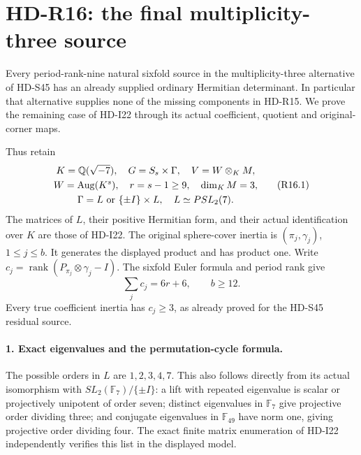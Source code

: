 \section{HD-R16: the final multiplicity-three source}
\label{sec:rank-three-tensor-final-budget}

Every period-rank-nine natural sixfold source in the
multiplicity-three alternative of HD-S45 has an already
supplied ordinary Hermitian determinant. In particular that
alternative supplies none of the missing components in HD-R15.
We prove the remaining case of HD-I22 through its actual
coefficient, quotient and original-corner maps.

Thus retain
\[
 \begin{gathered}
 K=\mathbb Q(\sqrt{-7}),\quad G=S_s\times\Gamma,
       \quad V=W\otimes_KM,\\
 W=\operatorname{Aug}(K^s),\quad r=s-1\ge9,\quad\dim_KM=3,\\
 \Gamma=L\ \hbox{or}\ \{\pm I\}\times L,
       \quad L\simeq PSL_2(7).
 \end{gathered}                                           \tag{R16.1}
\]
The matrices of \(L\), their positive Hermitian form, and
their actual identification over \(K\) are those of HD-I22.
The original sphere-cover inertia is
\((\pi_j,\gamma_j)\), \(1\le j\le b\). It generates the
displayed product and has product one. Write
\(c_j=\operatorname{rank}(P_{\pi_j}\otimes\gamma_j-I)\).
The sixfold Euler formula and period rank give
\[
              \sum_jc_j=6r+6,\qquad b\ge12.              \tag{R16.2}
\]
Every true coefficient inertia has \(c_j\ge3\), as
already proved for the HD-S45 residual source.

\paragraph{1. Exact eigenvalues and the permutation-cycle formula.}
The possible orders in \(L\) are \(1,2,3,4,7\).
This also follows directly from its actual isomorphism with
\(SL_2(\mathbb F_7)/\{\pm I\}\): a lift with repeated
eigenvalue is scalar or projectively unipotent of order seven;
distinct eigenvalues in \(\mathbb F_7\) give projective
order dividing three; and conjugate eigenvalues in
\(\mathbb F_{49}\) have norm one, giving projective order
dividing four. The exact finite matrix enumeration of HD-I22
independently verifies this list in the displayed model.

